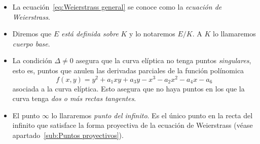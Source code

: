 \begin{nota}\leavevmode
	\begin{itemize}
		\item La ecuación~\eqref{eq:Weierstrass general} se conoce como la \emph{ecuación de Weierstrass}.
		\item Diremos que $E$ \emph{está definida sobre} $K$ y lo notaremos $E/K$. A $K$ lo llamaremos \emph{cuerpo base}.
		\item La condición $\Delta \neq 0$ asegura que la curva elíptica no tenga puntos \emph{singulares}, esto es, puntos que anulen las derivadas parciales de la función polínomica
		$$
			f(x, y) = y^2 + a_1 x y + a_3 y - x^3 - a_2 x^2 - a_4 x - a_6
		$$
		asociada a la curva elíptica. Esto asegura que no haya puntos en los que la curva tenga \emph{dos o más rectas tangentes}.
		\item El punto $\infty$ lo llararemos \emph{punto del infinito}. Es el único punto en la recta del infinito que satisface la forma proyectiva de la ecuación de Weierstrass (véase apartado~\ref{sub:Puntos proyectivos}).
	\end{itemize}
\end{nota}

